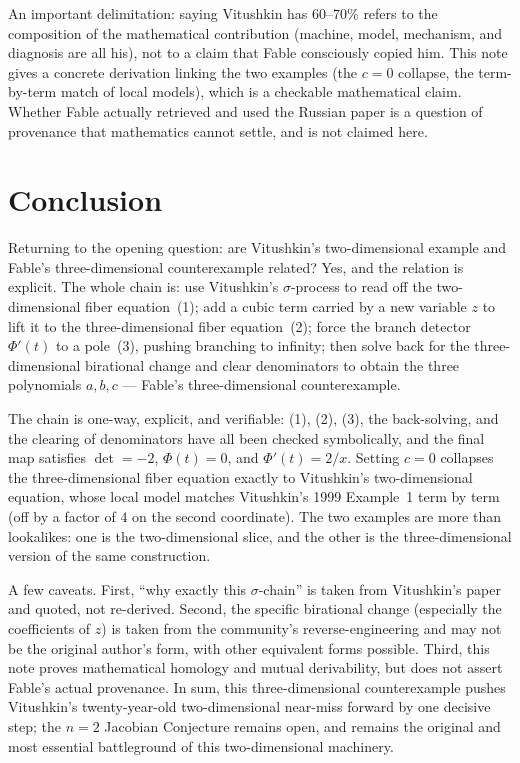 \documentclass[11pt]{article}
\theoremstyle{plain}
\theoremstyle{definition}
\begin{document}
An important delimitation: saying Vitushkin has $60$--$70\%$ refers to the
composition of the mathematical contribution (machine, model, mechanism, and
diagnosis are all his), not to a claim that Fable consciously copied him.
This note gives a concrete derivation linking the two examples (the $c=0$
collapse, the term-by-term match of local models), which is a checkable
mathematical claim. Whether Fable actually retrieved and used the Russian
paper is a question of provenance that mathematics cannot settle, and is not
claimed here.

\section*{Conclusion}
Returning to the opening question: are Vitushkin's two-dimensional example
and Fable's three-dimensional counterexample related? Yes, and the relation
is explicit. The whole chain is: use Vitushkin's $\sigma$-process to
read off the two-dimensional fiber equation~(1); add a cubic term carried by
a new variable $z$ to lift it to the three-dimensional fiber equation~(2);
force the branch detector $\Phi'(t)$ to a pole~(3), pushing branching to
infinity; then solve back for the three-dimensional birational change and
clear denominators to obtain the three polynomials $a,b,c$ --- Fable's
three-dimensional counterexample.

The chain is one-way, explicit, and verifiable: (1), (2), (3), the
back-solving, and the clearing of denominators have all been checked
symbolically, and the final map satisfies $\det=-2$, $\Phi(t)=0$, and
$\Phi'(t)=2/x$. Setting $c=0$ collapses the three-dimensional fiber equation
exactly to Vitushkin's two-dimensional equation, whose local model matches
Vitushkin's 1999 Example~1 term by term (off by a factor of $4$ on the second
coordinate). The two examples are more than lookalikes: one is the
two-dimensional slice, and the other is the three-dimensional version of the
same construction.

A few caveats. First, ``why exactly this $\sigma$-chain'' is taken
from Vitushkin's paper and quoted, not re-derived. Second, the specific
birational change (especially the coefficients of $z$) is taken from the
community's reverse-engineering and may not be the original author's form,
with other equivalent forms possible. Third, this note proves mathematical
homology and mutual derivability, but does not assert Fable's actual
provenance. In sum, this three-dimensional counterexample pushes Vitushkin's
twenty-year-old two-dimensional near-miss forward by one decisive step; the
$n=2$ Jacobian Conjecture remains open, and remains the original and most
essential battleground of this two-dimensional machinery.
\end{document}
